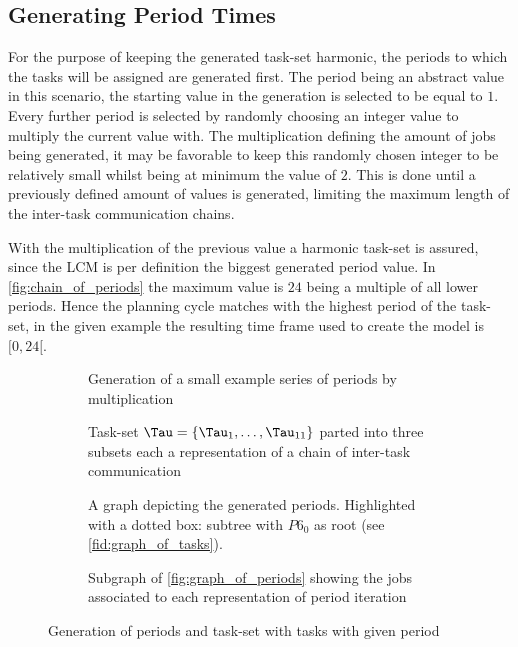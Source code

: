 \subsection{Generating Period Times}\label{sec:generating_period_times}
For the purpose of keeping the generated task-set harmonic, the periods to which the tasks will be assigned are generated first.
The period being an abstract value in this scenario, the starting value in the generation is selected to be equal to $1$.
Every further period is selected by randomly choosing an integer value to multiply the current value with.
The multiplication defining the amount of jobs being generated, it may be favorable to keep this randomly chosen integer to be relatively small whilst being at minimum the value of $2$. 
This is done until a previously defined amount of values is generated, limiting the maximum length of the inter-task communication chains.

With the multiplication of the previous value a harmonic task-set is assured, since the \ac{LCM} is per definition the biggest generated period value.
In \cref{fig:chain_of_periods} the maximum value is $24$ being a multiple of all lower periods.
Hence the planning cycle matches with the highest period of the task-set, in the given example the resulting time frame used to create the model is $[0,24[$.

\begin{figure}[ht]
	\begin{subfigure}[c]{0.45\textwidth}
		\resizebox{\textwidth}{!}{%
			\label{fig:chain_of_periods}
		
		}
		\caption{Generation of a small example series of periods by multiplication}
	\end{subfigure}
	\hfill
	\begin{subfigure}[c]{0.45\textwidth}
		\resizebox{\textwidth}{!}{%
			\label{fig:chain_of_tasks}
			
		}
		\caption{Task-set $\Tau=\{\Tau_{1}, \ldots, \Tau_{11}\}$ parted into three subsets each a representation of a chain of inter-task communication}
	\end{subfigure}
	\begin{subfigure}[c]{0.450\textwidth}
		\resizebox{\textwidth}{!}{%
			\label{fig:graph_of_periods}
			
		}
		\caption{A graph depicting the generated periods. Highlighted with a dotted box: subtree with $P6_0$ as root (see \cref{fid:graph_of_tasks}).}
	\end{subfigure}
	\hfill
	\begin{subfigure}[c]{0.45\textwidth}
		\resizebox{\textwidth}{!}{%
			\label{fig:graph_of_tasks}
			
		}
		\caption{Subgraph of \cref{fig:graph_of_periods} showing the jobs associated to each representation of period iteration}
	\end{subfigure}
	\caption{Generation of periods and task-set with tasks with given period}
\end{figure}

